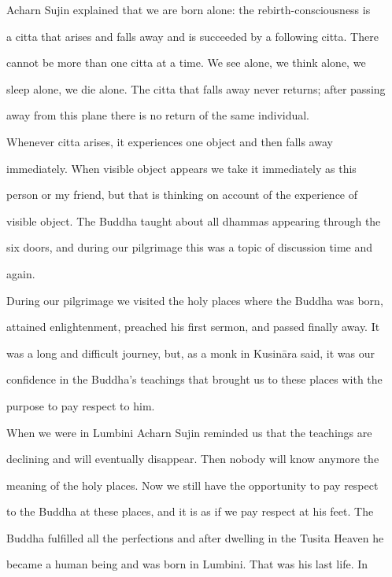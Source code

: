    Acharn Sujin explained that we are born alone: the rebirth-consciousness is  

a citta that arises and falls away and is succeeded by a following citta. There  

cannot be  more  than  one  citta  at  a  time. We  see  alone, we  think  alone, we  

sleep alone, we die alone. The citta that falls away never returns; after passing  

away from this plane there is no return of the same individual. 

   Whenever   citta   arises,   it   experiences   one   object   and   then   falls   away  

immediately.   When   visible   object   appears   we   take   it   immediately   as   this  

person   or  my  friend,  but   that   is  thinking  on  account  of  the   experience  of  

visible  object. The Buddha taught  about  all  dhammas  appearing through the  

six  doors,  and  during  our pilgrimage this was  a topic  of discussion time  and  

again.  



During our pilgrimage we visited the holy places where the Buddha was born,  

attained enlightenment, preached his first sermon, and passed finally away. It  

was  a long  and difficult journey,  but,  as  a monk in Kusināra  said, it was our  

confidence in the Buddha’s teachings that brought us to these places with the  

purpose to pay respect to him. 

   When we were in Lumbini Acharn Sujin reminded us that the teachings are  

declining and will eventually disappear. Then nobody will know anymore the  

meaning of the holy places. Now we still have the opportunity to pay respect  

to the Buddha  at these places,  and  it  is  as  if we pay respect  at his feet. The  

Buddha fulfilled all the perfections and after dwelling in the Tusita Heaven he  

became  a  human being  and was born  in  Lumbini.  That was his  last  life.  In  

